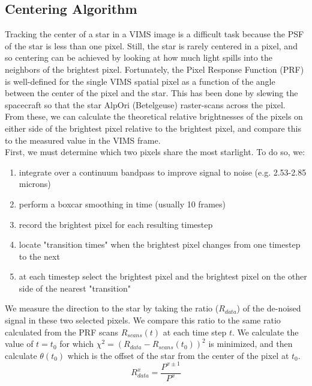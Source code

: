 \documentclass[12pt]{article}
\begin{document}
\subsection{Centering Algorithm}

Tracking the center of a star in a VIMS image is a difficult task because the
PSF of the star is less than one pixel. Still, the star is rarely centered in a
pixel, and so centering can be achieved by looking at how much light spills
into the neighbors of the brightest pixel. Fortunately, the Pixel Response
Function (PRF) is well-defined for the single VIMS spatial pixel as a function
of the angle between the center of the pixel and the star. This has been done
by slewing the spacecraft so that the star AlpOri (Betelgeuse) raster-scans
across the pixel. From these, we can calculate the theoretical relative
brightnesses of the pixels on either side of the brightest pixel relative to
the brightest pixel, and compare this to the measured value in the VIMS frame.
\\

First, we must determine which two pixels share the most starlight. To do so,
we:
\begin{enumerate}
  \item integrate over a continuum bandpass to improve signal to noise (e.g. 2.53-2.85 microns)
  \item perform a boxcar smoothing in time (usually 10 frames)
  \item record the brightest pixel for each resulting timestep
  \item locate "transition times" when the brightest pixel changes from one timestep to the next
  \item at each timestep select the brightest pixel and the brightest pixel on the other side of the nearest "transition"
\end{enumerate}

We measure the direction to the star by taking the ratio ($R_{data}$) of the
de-noised signal in these two selected pixels.  We compare this ratio to the
same ratio calculated from the PRF scans $R_{scans}(t)$ at each time step $t$.
We calculate the value of $t=t_0$ for which $\chi^2 =
(R_{data}-R_{scans}(t_0))^2$ is minimized, and then calculate $\theta(t_0)$
which is the offset of the star from the center of the pixel at $t_0$. \\

\begin{equation}
R_{data}^x = \frac{P^{x\pm1}}{P^{x}}
\end{equation}
\end{document}
